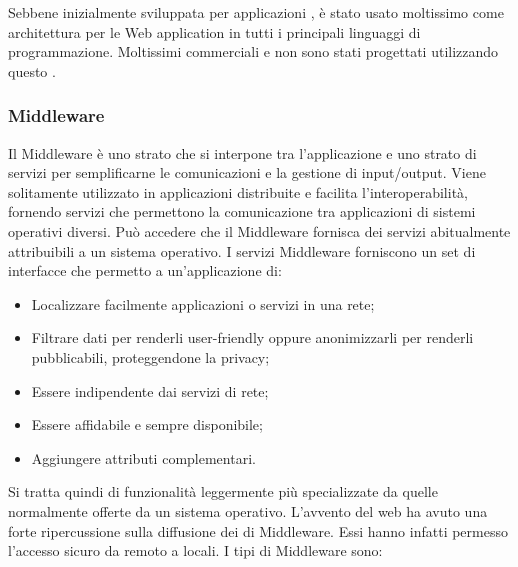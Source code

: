 \documentclass[12pt,a4paper]{article}
\begin{document}
Sebbene inizialmente sviluppata per applicazioni ,  è stato usato moltissimo come architettura per le Web application in tutti i principali linguaggi di programmazione. Moltissimi  commerciali e non sono stati progettati utilizzando questo .

\subsubsection{Middleware}
Il Middleware è uno strato  che si interpone tra l’applicazione  e uno strato di servizi per semplificarne le comunicazioni e la gestione di input/output. Viene solitamente utilizzato in applicazioni distribuite e facilita l’interoperabilità, fornendo servizi che permettono la comunicazione tra applicazioni di sistemi operativi diversi. Può accedere che il Middleware fornisca dei servizi abitualmente attribuibili a un sistema operativo. I servizi Middleware forniscono un set di interfacce che permetto a un’applicazione di:
\begin{itemize}
	\item Localizzare facilmente applicazioni o servizi in una rete;
	\item Filtrare dati per renderli user-friendly oppure anonimizzarli per renderli pubblicabili, proteggendone la privacy;
	\item Essere indipendente dai servizi di rete;
	\item Essere affidabile e sempre disponibile;
	\item Aggiungere attributi complementari.
\end{itemize}
Si tratta quindi di funzionalità leggermente più specializzate da quelle normalmente offerte da un sistema operativo. L’avvento del web ha avuto una forte ripercussione sulla diffusione dei  di Middleware. Essi hanno infatti permesso l’accesso sicuro da remoto a  locali. I tipi di Middleware sono:
\end{document}
